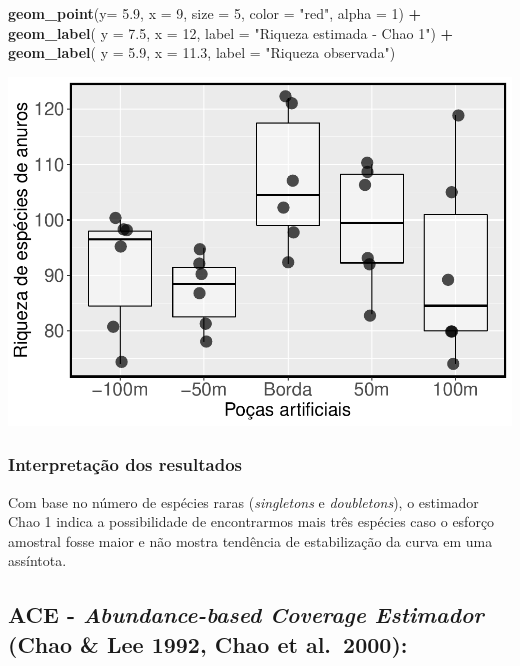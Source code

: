 \documentclass[
]{book}
\newenvironment{Shaded}{\begin{snugshade}}{\end{snugshade}}
\newcommand{\DataTypeTok}[1]{\textcolor[rgb]{0.13,0.29,0.53}{#1}}
\newcommand{\DecValTok}[1]{\textcolor[rgb]{0.00,0.00,0.81}{#1}}
\newcommand{\FloatTok}[1]{\textcolor[rgb]{0.00,0.00,0.81}{#1}}
\newcommand{\KeywordTok}[1]{\textcolor[rgb]{0.13,0.29,0.53}{\textbf{#1}}}
\newcommand{\NormalTok}[1]{#1}
\newcommand{\OperatorTok}[1]{\textcolor[rgb]{0.81,0.36,0.00}{\textbf{#1}}}
\newcommand{\StringTok}[1]{\textcolor[rgb]{0.31,0.60,0.02}{#1}}
\begin{document}
\begin{Shaded}
\begin{Highlighting}[]
\StringTok{  }\KeywordTok{geom_point}\NormalTok{(}\DataTypeTok{y=} \FloatTok{5.9}\NormalTok{, }\DataTypeTok{x =} \DecValTok{9}\NormalTok{, }\DataTypeTok{size =} \DecValTok{5}\NormalTok{, }\DataTypeTok{color =} \StringTok{"red"}\NormalTok{, }\DataTypeTok{alpha =} \DecValTok{1}\NormalTok{) }\OperatorTok{+}\StringTok{ }
\StringTok{  }\KeywordTok{geom_label}\NormalTok{( }\DataTypeTok{y =} \FloatTok{7.5}\NormalTok{, }\DataTypeTok{x =} \DecValTok{12}\NormalTok{, }\DataTypeTok{label =} \StringTok{"Riqueza estimada - Chao 1"}\NormalTok{) }\OperatorTok{+}
\StringTok{  }\KeywordTok{geom_label}\NormalTok{( }\DataTypeTok{y =} \FloatTok{5.9}\NormalTok{, }\DataTypeTok{x =} \FloatTok{11.3}\NormalTok{, }\DataTypeTok{label =} \StringTok{"Riqueza observada"}\NormalTok{)}
\end{Highlighting}
\end{Shaded}

\includegraphics{livro_r_ecologia_files/figure-latex/unnamed-chunk-21-1.pdf}

\hypertarget{interpretauxe7uxe3o-dos-resultados}{%
\subsubsection{Interpretação dos resultados}\label{interpretauxe7uxe3o-dos-resultados}}

Com base no número de espécies raras (\emph{singletons} e \emph{doubletons}), o estimador Chao 1 indica a possibilidade de encontrarmos mais três espécies caso o esforço amostral fosse maior e não mostra tendência de estabilização da curva em uma assíntota.

\hypertarget{ace---abundance-based-coverage-estimador-chao-lee-1992-chao-et-al.-2000}{%
\subsection{\texorpdfstring{ACE - \emph{Abundance-based Coverage Estimador} (Chao \& Lee 1992, Chao et al.~2000):}{ACE - Abundance-based Coverage Estimador (Chao \& Lee 1992, Chao et al.~2000):}}\label{ace---abundance-based-coverage-estimador-chao-lee-1992-chao-et-al.-2000}}
\end{document}
